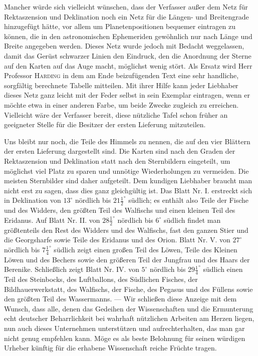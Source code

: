 Mancher würde sich vielleicht wünschen, dass der Verfasser außer dem Netz für Rektaszension und Deklination noch ein Netz für die Längen- und Breitengrade hinzugefügt hätte, vor allem um Planetenpositionen bequemer eintragen zu können, die in den astronomischen Ephemeriden gewöhnlich nur nach Länge und Breite angegeben werden. Dieses Netz wurde jedoch mit Bedacht weggelassen, damit das Gerüst schwarzer Linien den Eindruck, den die Anordnung der Sterne auf den Karten auf das Auge macht, möglichst wenig stört. Als Ersatz wird Herr Professor \textsc{Harding} in dem am Ende beizufügenden Text eine sehr handliche, sorgfältig berechnete Tabelle mitteilen. Mit ihrer Hilfe kann jeder Liebhaber dieses Netz ganz leicht mit der Feder selbst in sein Exemplar eintragen, wenn er möchte etwa in einer anderen Farbe, um beide Zwecke zugleich zu erreichen. Vielleicht wäre der Verfasser bereit, diese nützliche Tafel schon früher an geeigneter Stelle für die Besitzer der ersten Lieferung mitzuteilen.

Uns bleibt nur noch, die Teile des Himmels zu nennen, die auf den vier Blättern der ersten Lieferung dargestellt sind. Die Karten sind nach den Graden der Rektaszension und Deklination statt nach den Sternbildern eingeteilt, um möglichst viel Platz zu sparen und unnötige Wiederholungen zu vermeiden. Die meisten Sternbilder sind daher aufgeteilt. Dem kundigen Liebhaber braucht man nicht erst zu sagen, dass dies ganz gleichgültig ist. Das Blatt Nr. I. erstreckt sich in Deklination von $13^\circ$ nördlich bis $21\frac{1}{2}^\circ$ südlich; es enthält also Teile der Fische und des Widders, den größten Teil des Walfischs und einen kleinen Teil des Eridanus. Auf Blatt Nr. II. von $28\frac{1}{2}^\circ$ nördlich bis $6^\circ$ südlich findet man größtenteils den Rest des Widders und des Walfischs, fast den ganzen Stier und die Georgsharfe sowie Teile des Eridanus und des Orion. Blatt Nr. V. von $27^\circ$ nördlich bis $7\frac{1}{4}^\circ$ südlich zeigt einen großen Teil des Löwen, Teile des Kleinen Löwen und des Bechers sowie den größeren Teil der Jungfrau und des Haars der Berenike. Schließlich zeigt Blatt Nr. IV. von $5^\circ$ nördlich bis $29\frac{1}{4}^\circ$ südlich einen Teil des Steinbocks, des Luftballons, des Südlichen Fisches, der Bildhauerwerkstatt, des Walfischs, der Fische, des Pegasus und des Füllens sowie den größten Teil des Wassermanns. --- Wir schließen diese Anzeige mit dem Wunsch, dass alle, denen das Gedeihen der Wissenschaften und die Ermunterung echt deutscher Beharrlichkeit bei wahrhaft nützlichen Arbeiten am Herzen liegen, nun auch dieses Unternehmen unterstützen und aufrechterhalten, das man gar nicht genug empfehlen kann. Möge es als beste Belohnung für seinen würdigen Urheber künftig für die erhabene Wissenschaft reiche Früchte tragen.
